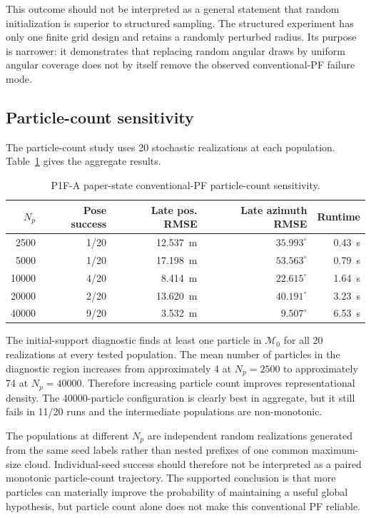 This outcome should not be interpreted as a general statement that random initialization is superior to structured sampling. The structured experiment has only one finite grid design and retains a randomly perturbed radius. Its purpose is narrower: it demonstrates that replacing random angular draws by uniform angular coverage does not by itself remove the observed conventional-PF failure mode.

\subsection{Particle-count sensitivity}
The particle-count study uses 20 stochastic realizations at each population. Table~\ref{tab:p1fa_particles} gives the aggregate results.
\begin{table}[ht]
\centering
\caption{P1F-A paper-state conventional-PF particle-count sensitivity.}
\label{tab:p1fa_particles}
\begin{tabular}{rrrrr}
\toprule
$N_p$ & Pose success & Late pos. RMSE & Late azimuth RMSE & Runtime\\
\midrule
2500 & 1/20 & \SI{12.537}{m} & $35.993^\circ$ & \SI{0.43}{s}\\
5000 & 1/20 & \SI{17.198}{m} & $53.563^\circ$ & \SI{0.79}{s}\\
10000 & 4/20 & \SI{8.414}{m} & $22.615^\circ$ & \SI{1.64}{s}\\
20000 & 2/20 & \SI{13.620}{m} & $40.191^\circ$ & \SI{3.23}{s}\\
40000 & 9/20 & \SI{3.532}{m} & $9.507^\circ$ & \SI{6.53}{s}\\
\bottomrule
\end{tabular}
\end{table}

The initial-support diagnostic finds at least one particle in $\mathcal M_0$ for all 20 realizations at every tested population. The mean number of particles in the diagnostic region increases from approximately 4 at $N_p=2500$ to approximately 74 at $N_p=40000$. Therefore increasing particle count improves representational density. The $40000$-particle configuration is clearly best in aggregate, but it still fails in 11/20 runs and the intermediate populations are non-monotonic.

The populations at different $N_p$ are independent random realizations generated from the same seed labels rather than nested prefixes of one common maximum-size cloud. Individual-seed success should therefore not be interpreted as a paired monotonic particle-count trajectory. The supported conclusion is that more particles can materially improve the probability of maintaining a useful global hypothesis, but particle count alone does not make this conventional PF reliable.

